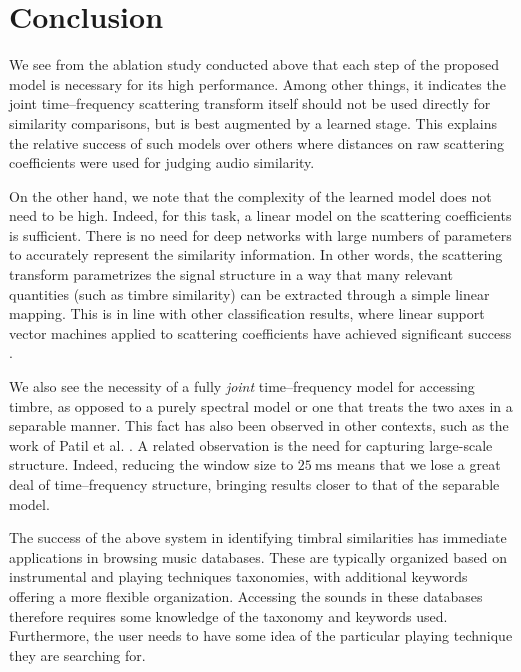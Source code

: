 \documentclass{bmcart}
\newcommand{\nmu}{}
\begin{document}
\section*{\nmu Conclusion}
\label{sec:conclusion}

We see from the ablation study conducted above that each step of the proposed model is necessary for its high performance.
Among other things, it indicates the joint time--frequency scattering transform itself should not be used directly for similarity comparisons, but is best augmented by a learned stage.
This explains the relative success of such models \cite{lostanlen2018jasmp,lostanlen2018extended} over others where distances on raw scattering coefficients were used for judging audio similarity.

On the other hand, we note that the complexity of the learned model does not need to be high.
Indeed, for this task, a linear model on the scattering coefficients is sufficient.
There is no need for deep networks with large numbers of parameters to accurately represent the similarity information.
In other words, the scattering transform parametrizes the signal structure in a way that many relevant quantities (such as timbre similarity) can be extracted through a simple linear mapping.
This is in line with other classification results, where linear support vector machines applied to scattering coefficients have achieved significant success \cite{anden2015mlsp,anden2019tsp}.

We also see the necessity of a fully \emph{joint} time--frequency model for accessing timbre, as opposed to a purely spectral model or one that treats the two axes in a separable manner.
This fact has also been observed in other contexts, such as the work of Patil et al. \cite{patil2012ploscompbiol}.
A related observation is the need for capturing large-scale structure.
Indeed, reducing the window size to $25~\mathrm{ms}$ means that we lose a great deal of time--frequency structure, bringing results closer to that of the separable model.

The success of the above system in identifying timbral similarities has immediate applications in browsing music databases.
These are typically organized based on instrumental and playing techniques taxonomies, with additional keywords offering a more flexible organization.
Accessing the sounds in these databases therefore requires some knowledge of the taxonomy and keywords used.
Furthermore, the user needs to have some idea of the particular playing technique they are searching for.
\end{document}
